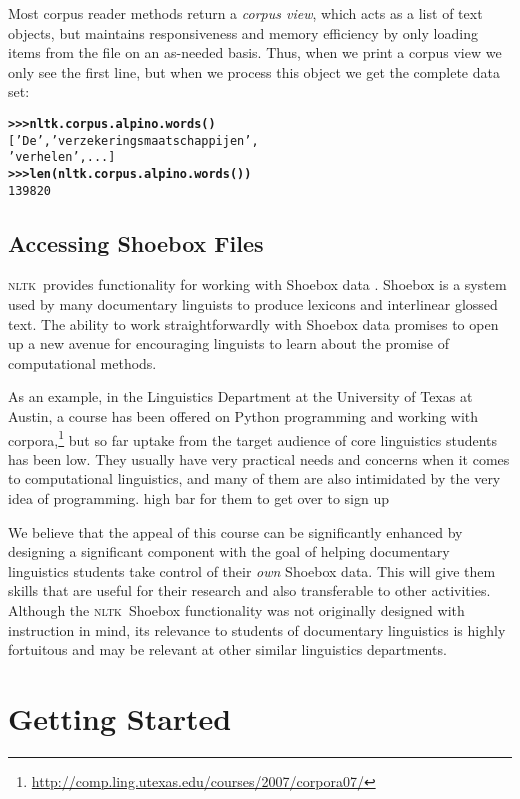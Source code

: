 \documentclass[11pt]{article}
\newcommand{\NLTK}{\textsc{nltk}}
\begin{document}
Most corpus reader methods return a \emph{corpus view}, which acts as
a list of text objects, but maintains responsiveness and memory
efficiency by only loading items from the file on an as-needed basis.
Thus, when we print a corpus view we only see the first line, but when
we process this object we get the complete data set:

{\footnotesize
\begin{alltt}
\textbf{>>> nltk.corpus.alpino.words()}
['De', 'verzekeringsmaatschappijen',
'verhelen', ...]
\textbf{>>> len(nltk.corpus.alpino.words())}
139820
\end{alltt}}

\subsection{Accessing Shoebox Files}

\NLTK\ provides functionality for working with Shoebox data
\cite{Robinson07}. Shoebox is a system used by many
documentary linguists to produce lexicons and interlinear glossed text.  The
ability to work straightforwardly with Shoebox data promises to open
up a new avenue for encouraging linguists to learn about the promise
of computational methods. 

As an example, in the Linguistics Department at the University of
Texas at Austin, a course has been offered on Python programming and
working with
corpora,\footnote{\url{http://comp.ling.utexas.edu/courses/2007/corpora07/}}
but so far uptake from the target audience of core linguistics
students has been low. They usually have very practical needs and
concerns when it comes to computational linguistics, and many of them
are also intimidated by the very idea of programming. %
high bar for them to get over to sign up

We believe that the appeal of this course can be significantly
enhanced by designing a significant component
with the goal of helping documentary linguistics students take control of their
\emph{own} Shoebox data. This will give them  skills that are
useful for their research and also transferable to other activities.
Although the \NLTK\ Shoebox functionality was not
originally designed with instruction in mind, its relevance to
students of documentary linguistics is highly fortuitous and
may be relevant at other similar linguistics departments.

\section{Getting Started}
\label{sec:getting-started}
\end{document}
